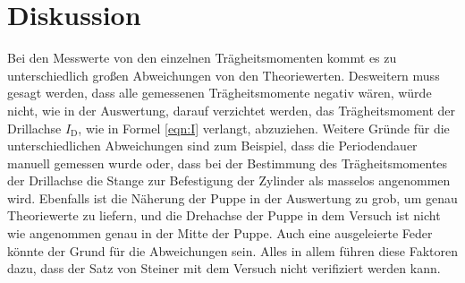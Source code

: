 \section{Diskussion}
\label{sec:Diskussion}
Bei den Messwerte von den einzelnen Trägheitsmomenten kommt es zu unterschiedlich großen Abweichungen von den Theoriewerten.
Desweitern muss gesagt werden, dass alle gemessenen Trägheitsmomente negativ wären, würde nicht, wie in der Auswertung,
darauf verzichtet werden, das Trägheitsmoment der Drillachse $I_\mathrm{D}$, wie in Formel \eqref{eqn:I} verlangt, abzuziehen.
Weitere Gründe für die unterschiedlichen Abweichungen sind zum Beispiel, dass die
Periodendauer manuell gemessen wurde oder, dass bei der Bestimmung
des Trägheitsmomentes der Drillachse die Stange zur Befestigung der
Zylinder als masselos angenommen wird. Ebenfalls ist die Näherung der Puppe in der Auswertung zu grob, um genau Theoriewerte zu liefern, und
die Drehachse der Puppe in dem Versuch ist nicht wie angenommen genau in der Mitte der Puppe.
Auch eine ausgeleierte Feder könnte der Grund für die Abweichungen sein.
Alles in allem führen diese Faktoren dazu, dass der Satz von Steiner mit dem Versuch nicht verifiziert werden kann.
